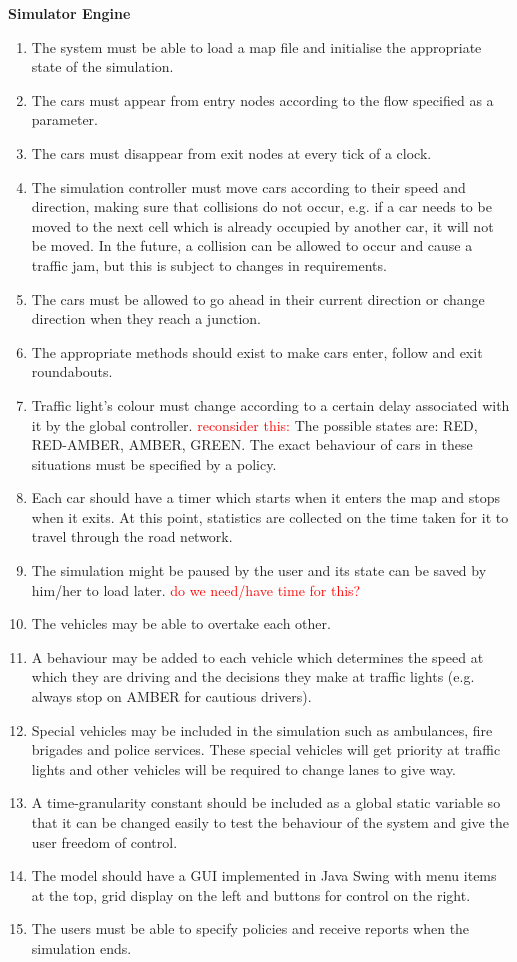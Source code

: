 \documentclass{article}
\begin{document}
	
	\noindent
	{\bf Simulator Engine}
	\begin{enumerate}
		
		\item  The system must be able to load a map file and initialise the appropriate state of the simulation.
		
		\item The cars must appear from entry nodes according to the flow specified as a parameter.
		\item The cars must disappear from exit nodes at every tick of a clock.
		\item The simulation controller must move cars according to their speed and direction, making sure that collisions do not occur, e.g. if a car needs to be moved to the next cell which is already occupied by another car, it will not be moved. In the future, a collision can be allowed to occur and cause a traffic jam, but this is subject to changes in requirements.
		\item The cars must be allowed to go ahead in their current direction or change direction when they reach a junction. 
		\item The appropriate methods should exist to make cars enter, follow and exit roundabouts.
		\item Traffic light's colour must change according to a certain delay associated with it by the global controller. \textcolor{red}{reconsider this:} The possible states are: RED, RED-AMBER, AMBER, GREEN. The exact behaviour of cars in these situations must be specified by a policy.
		\item Each car should have a timer which starts when it enters the map and stops when it exits. At this point, statistics are collected on the time taken for it to travel through the road network.
		\item  The simulation might be paused by the user and its state can be saved by him/her to load later. \textcolor{red}{do we need/have time for this?}
		\item The vehicles may be able to overtake each other. 
		\item  A behaviour may be added to each vehicle which determines the  speed at which they are driving and the decisions they make at traffic lights (e.g. always stop on AMBER for cautious drivers).
		\item Special vehicles may be included in the simulation such as ambulances, fire brigades and police services. These special vehicles will get priority at traffic lights and other vehicles will be required to change lanes to give way. 
		\item A time-granularity constant should be included as a global static variable so that it can be changed easily to test the behaviour of the system and give the user freedom of control. 
		\item The model should have a GUI implemented in Java Swing with menu items at the top, grid display on the left and buttons for control on the right. 
		\item The users must be able to specify policies and receive reports when the simulation ends.  
		
	\end{enumerate}
	
\end{document}
